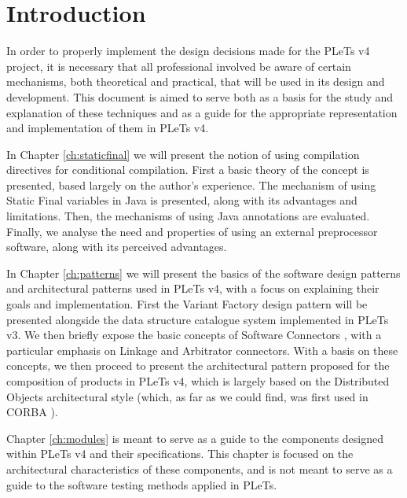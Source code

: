 \chapter*{Introduction}

In order to properly implement the design decisions made for the PLeTs v4 project, it is necessary that all professional involved be aware of certain mechanisms, both theoretical and practical, that will be used in its design and development. This document is aimed to serve both as a basis for the study and explanation of these techniques and as a guide for the appropriate representation and implementation of them in PLeTs v4.

In Chapter \ref{ch:staticfinal} we will present the notion of using compilation directives for conditional compilation. First a basic theory of the concept is presented, based largely on the author's experience. The mechanism of using Static Final variables in Java is presented, along with its advantages and limitations. Then, the mechanisms of using Java annotations are evaluated. Finally, we analyse the need and properties of using an external preprocessor software, along with its perceived advantages.

In Chapter \ref{ch:patterns} we will present the basics of the software design patterns and architectural patterns used in PLeTs v4, with a focus on explaining their goals and implementation. First the Variant Factory design pattern will be presented \cite{LASER:2015} alongside the data structure catalogue system implemented in PLeTs v3. We then briefly expose the basic concepts of Software Connectors \cite{TAYLOR:2009}, with a particular emphasis on Linkage and Arbitrator connectors. With a basis on these concepts, we then proceed to present the architectural pattern proposed for the composition of products in PLeTs v4, which is largely based on the Distributed Objects architectural style (which, as far as we could find, was first used in CORBA \cite{CORBA:2012}).

Chapter \ref{ch:modules} is meant to serve as a guide to the components designed within PLeTs v4 and their specifications. This chapter is focused on the architectural characteristics of these components, and is not meant to serve as a guide to the software testing methods applied in PLeTs.
